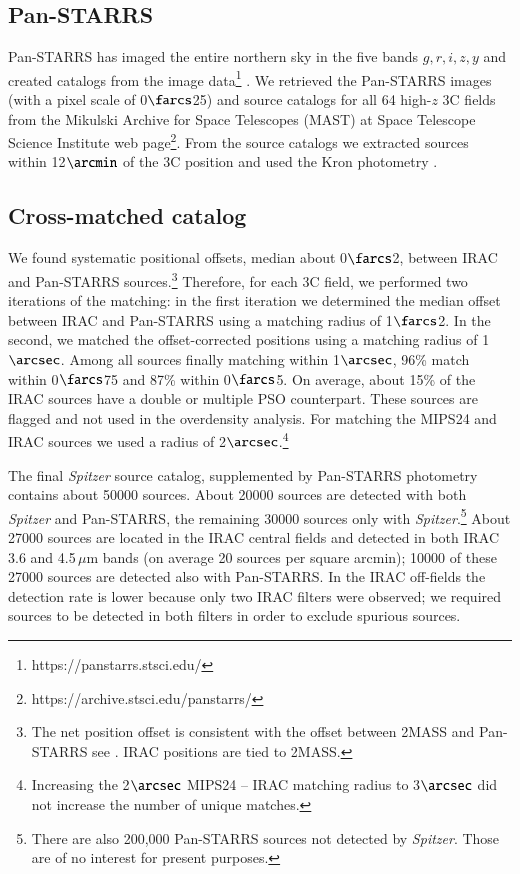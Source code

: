 \documentclass[mathleft,fleqn,%
]{an}
\begin{document}
\subsection{Pan-STARRS} \label{sec:data_panstarrs}

Pan-STARRS has imaged the entire northern sky in the five bands $g,r,i,z,y$
and created catalogs from 
the image data\footnote{https://panstarrs.stsci.edu/}
\citep{Chambers16, Flewelling16}.
We retrieved the Pan-STARRS images (with a pixel scale of 0$\farcs$25) and source
catalogs for all 64 high-$z$ 3C fields 
from the Mikulski Archive for Space Telescopes (MAST) at Space
Telescope Science Institute web  
page\footnote{https://archive.stsci.edu/panstarrs/}.
From the source catalogs we extracted sources within 12$\arcmin$ of
the 3C position 
and used the Kron photometry \citep{Magnier16}. 

\subsection{Cross-matched catalog} \label{sec:catalog}

We found systematic positional offsets, 
median about 0$\farcs$2, between
IRAC and Pan-STARRS sources.\footnote{The net position offset 
is consistent with the
offset between 2MASS and Pan-STARRS see \citet{Magnier16}.  
IRAC positions are tied to
2MASS.}
Therefore, for each 3C field, we performed two iterations of the
matching: in the first 
iteration we determined the median offset between IRAC and Pan-STARRS
using a matching radius of 1$\farcs$2.
In the second, we matched the offset-corrected positions using a matching radius
of 1$\arcsec$.
Among all sources finally matching within 1$\arcsec$, 96\% match
within 0$\farcs$75 and  87\% within 0$\farcs$5.
On average, about 15\% of the IRAC sources have a
double or multiple PSO counterpart.
These sources are flagged and not used in the overdensity analysis.
For matching the MIPS24 and IRAC sources we used 
a radius of 2$\arcsec$.\footnote{Increasing the 2$\arcsec$ MIPS24 --
  IRAC matching 
radius to 3$\arcsec$ did not increase the number of unique matches.}

The final {\it Spitzer} source catalog, supplemented by Pan-STARRS
photometry contains
about 50000 sources. About 20000 sources are detected with both
{\it Spitzer} and Pan-STARRS, the remaining 30000 sources only 
with {\it Spitzer}.\footnote{There are also 200,000 Pan-STARRS sources 
 not detected by {\it Spitzer}. Those are of no interest for present
 purposes.}  
About 27000 sources are located in the IRAC central fields and 
detected in both IRAC 3.6 and 4.5\,$\mu$m bands 
(on average 20 sources per square arcmin); 10000 of these 27000 
sources are detected also with Pan-STARRS.
In the IRAC off-fields the detection rate is lower because
only two IRAC filters were observed; we required sources to be
detected in both filters in order to exclude spurious sources.
\end{document}
